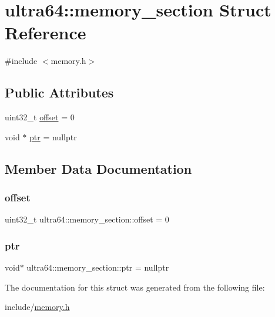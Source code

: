 \hypertarget{structultra64_1_1memory__section}{}\section{ultra64\+:\+:memory\+\_\+section Struct Reference}
\label{structultra64_1_1memory__section}


{\ttfamily \#include $<$memory.\+h$>$}

\subsection*{Public Attributes}
\begin{DoxyCompactItemize}
\item 
uint32\+\_\+t \hyperlink{structultra64_1_1memory__section_a0b3b346659febefd75c3b57ad4362179}{offset} = 0
\item 
void $\ast$ \hyperlink{structultra64_1_1memory__section_affbc3bd34afd0a4d69a31182d5a9e231}{ptr} = nullptr
\end{DoxyCompactItemize}


\subsection{Member Data Documentation}
\mbox{\label{structultra64_1_1memory__section_a0b3b346659febefd75c3b57ad4362179}} 
\subsubsection{\texorpdfstring{offset}{offset}}
{\footnotesize\ttfamily uint32\+\_\+t ultra64\+::memory\+\_\+section\+::offset = 0}

\mbox{\label{structultra64_1_1memory__section_affbc3bd34afd0a4d69a31182d5a9e231}} 
\subsubsection{\texorpdfstring{ptr}{ptr}}
{\footnotesize\ttfamily void$\ast$ ultra64\+::memory\+\_\+section\+::ptr = nullptr}



The documentation for this struct was generated from the following file\+:\begin{DoxyCompactItemize}
\item 
include/\hyperlink{memory_8h}{memory.\+h}\end{DoxyCompactItemize}
